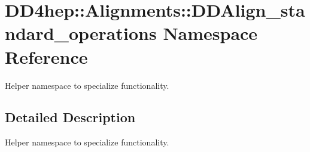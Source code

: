 \hypertarget{namespace_d_d4hep_1_1_alignments_1_1_d_d_align__standard__operations}{}\section{D\+D4hep\+:\+:Alignments\+:\+:D\+D\+Align\+\_\+standard\+\_\+operations Namespace Reference}
\label{namespace_d_d4hep_1_1_alignments_1_1_d_d_align__standard__operations}


Helper namespace to specialize functionality.  




\subsection{Detailed Description}
Helper namespace to specialize functionality. 